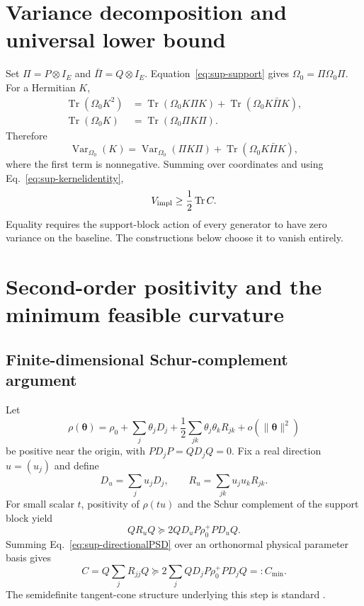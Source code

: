 \documentclass[aps,pra,preprint,nofootinbib]{revtex4-2}
\newcommand{\Tr}{\operatorname{Tr}}
\newcommand{\Var}{\operatorname{Var}}
\newcommand{\rhozero}{\rho_0}
\newcommand{\Omegazero}{\Omega_0}
\newcommand{\Cmin}{C_{\min}}
\newcommand{\Cker}{C}
\newcommand{\Vimpl}{V_{\rm impl}}
\begin{document}
\section{Variance decomposition and universal lower bound}

Set $\Pi=P\otimes I_E$ and $\bar\Pi=Q\otimes I_E$. Equation~\eqref{eq:sup-support} gives $\Omegazero=\Pi\Omegazero\Pi$. For a Hermitian $K$,
\begin{align}
 \Tr(\Omegazero K^2)
 &=\Tr(\Omegazero K\Pi K)
  +\Tr(\Omegazero K\bar\Pi K),\\
 \Tr(\Omegazero K)&=\Tr(\Omegazero\Pi K\Pi).
\end{align}
Therefore
\begin{equation}
 \Var_{\Omegazero}(K)
 =\Var_{\Omegazero}(\Pi K\Pi)
 +\Tr(\Omegazero K\bar\Pi K),
 \label{eq:sup-vardecomp}
\end{equation}
where the first term is nonnegative. Summing over coordinates and using Eq.~\eqref{eq:sup-kernelidentity},
\begin{equation}
 \Vimpl\ge\frac12\Tr\Cker.
 \label{eq:sup-lower}
\end{equation}
Equality requires the support-block action of every generator to have zero variance on the baseline. The constructions below choose it to vanish entirely.

\section{Second-order positivity and the minimum feasible curvature}

\subsection{Finite-dimensional Schur-complement argument}

Let
\begin{equation}
 \rho(\bm\theta)=\rhozero+\sum_j\theta_jD_j+\frac12\sum_{jk}\theta_j\theta_kR_{jk}+o(\|\bm\theta\|^2)
\end{equation}
be positive near the origin, with $PD_jP=QD_jQ=0$. Fix a real direction $u=(u_j)$ and define
\begin{equation}
 D_u=\sum_j u_jD_j,\qquad R_u=\sum_{jk}u_ju_kR_{jk}.
\end{equation}
For small scalar $t$, positivity of $\rho(tu)$ and the Schur complement of the support block yield
\begin{equation}
 QR_uQ\succeq2QD_uP\rhozero^+PD_uQ.
 \label{eq:sup-directionalPSD}
\end{equation}
Summing Eq.~\eqref{eq:sup-directionalPSD} over an orthonormal physical parameter basis gives
\begin{equation}
 \Cker=Q\sum_jR_{jj}Q
 \succeq2\sum_jQD_jP\rhozero^+PD_jQ=:\Cmin.
 \label{eq:sup-Cmin}
\end{equation}
The semidefinite tangent-cone structure underlying this step is standard \cite{Shapiro1997,BonnansCominettiShapiro1999}.
\end{document}
